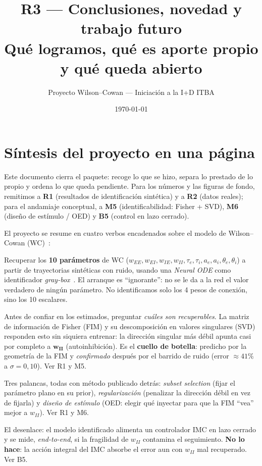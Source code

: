 \documentclass[11pt,a4paper]{article}
\title{\textbf{R3 --- Conclusiones, novedad y trabajo futuro}\\[2pt]\large Qué logramos, qué es aporte propio y qué queda abierto}
\author{Proyecto Wilson--Cowan --- Iniciación a la I+D ITBA}
\date{\today}
\begin{document}
\maketitle
\tableofcontents
\bigskip

\section{Síntesis del proyecto en una página}

Este documento cierra el paquete: recoge lo que se hizo, separa lo prestado de lo
propio y ordena lo que queda pendiente. Para los números y las figuras de fondo,
remitimos a \textbf{R1} (resultados de identificación sintética) y a \textbf{R2}
(datos reales); para el andamiaje conceptual, a \textbf{M5} (identificabilidad:
Fisher + SVD), \textbf{M6} (diseño de estímulo / OED) y \textbf{B5} (control en
lazo cerrado).

El proyecto se resume en cuatro verbos encadenados sobre el modelo de
Wilson--Cowan (WC)~\cite{wc1972}:

\begin{description}[leftmargin=1.4em,style=nextline]
  \item[Identificar.] Recuperar los \textbf{10 parámetros} de WC
  ($w_{EE},w_{EI},w_{IE},w_{II},\tau_e,\tau_i,a_e,a_i,\theta_e,\theta_i$) a partir
  de trayectorias sintéticas con ruido, usando una \emph{Neural ODE} como
  identificador \emph{gray-box}~\cite{chen2018,rackauckas2020}. El arranque es
  ``ignorante'': no se le da a la red el valor verdadero de ningún parámetro. No
  identificamos solo los 4 pesos de conexión, sino los 10 escalares.

  \item[Diagnosticar.] Antes de confiar en los estimados, preguntar
  \emph{cuáles son recuperables}. La matriz de información de Fisher (FIM) y su
  descomposición en valores singulares (SVD) responden esto sin siquiera
  entrenar: la dirección singular más débil apunta casi por completo a
  $\bm{w_{II}}$ (autoinhibición). Es el \textbf{cuello de botella}: predicho por la
  geometría de la FIM y \emph{confirmado} después por el barrido de ruido (error
  $\approx 41\%$ a $\sigma=0{,}10$). Ver R1 y M5.

  \item[Mitigar.] Tres palancas, todas con método publicado detrás:
  \emph{subset selection} (fijar el parámetro plano en su prior),
  \emph{regularización} (penalizar la dirección débil en vez de fijarla) y
  \emph{diseño de estímulo} (OED: elegir qué inyectar para que la FIM ``vea''
  mejor a $w_{II}$). Ver R1 y M6.

  \item[Validar orientado al control.] El desenlace: el modelo identificado
  alimenta un controlador IMC en lazo cerrado y se mide, \emph{end-to-end}, si la
  fragilidad de $w_{II}$ contamina el seguimiento. \textbf{No lo hace}: la acción
  integral del IMC absorbe el error aun con $w_{II}$ mal recuperado. Ver B5.
\end{description}
\end{document}
